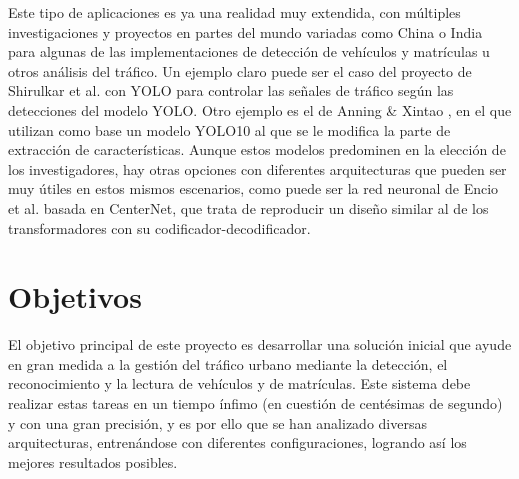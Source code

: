 \documentclass[12pt,a4paper,onecolumn,oneside]{report}
\begin{document}
Este tipo de aplicaciones es ya una realidad muy extendida, con múltiples investigaciones y proyectos en partes del mundo variadas como China o India para algunas de las implementaciones de detección de vehículos y matrículas u otros análisis del tráfico. Un ejemplo claro puede ser el caso del proyecto de Shirulkar et al. \cite{10984828} con YOLO para controlar las señales de tráfico según las detecciones del modelo YOLO. Otro ejemplo es el de Anning \& Xintao \cite{JI2025804}, en el que utilizan como base un modelo YOLO10 al que se le modifica la parte de extracción de características. Aunque estos modelos predominen en la elección de los investigadores, hay otras opciones con diferentes arquitecturas que pueden ser muy útiles en estos mismos escenarios, como puede ser la red neuronal de Encio et al. \cite{articleEncio} basada en CenterNet, que trata de reproducir un diseño similar al de los transformadores con su codificador-decodificador.

\section{Objetivos}

El objetivo principal de este proyecto es desarrollar una solución inicial que ayude en gran medida a la gestión del tráfico urbano mediante la detección, el reconocimiento y la lectura de vehículos y de matrículas. Este sistema debe realizar estas tareas en un tiempo ínfimo (en cuestión de centésimas de segundo) y con una gran precisión, y es por ello que se han analizado diversas arquitecturas, entrenándose con diferentes configuraciones, logrando así los mejores resultados posibles.
\end{document}
